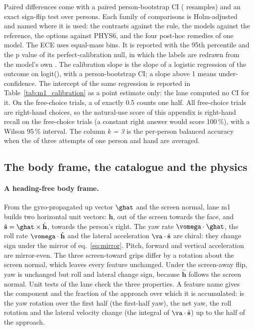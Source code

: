 Paired differences come with a paired person-bootstrap CI ( resamples) and an exact
sign-flip test over persons. Each family of comparisons is Holm-adjusted and named where it is used:
the  contrasts against the rule, the 
models against the reference, the  options against PHYS6, and
the four post-hoc remedies of one model. The ECE uses  equal-mass bins. It is reported
with the 95th percentile and the p value of its perfect-calibration null, in which the labels are
redrawn from the model's own \pright. The calibration slope is the slope of a logistic regression of
the outcome on logit(\pright), with a person-bootstrap CI; a slope above 1 means under-confidence. The
intercept of the same regression is reported in Table~\ref{tab:m1_calibration} as a point estimate
only: the lane computed no CI for it. On
the free-choice trials, a \pright{} of exactly 0.5 counts one half. All  free-choice
trials are right-hand choices, so the natural-use score of this appendix is right-hand recall on the
free-choice trials (a constant right answer would score 100\,\%), with a Wilson 95\,\% interval.
The column \emph{k = 3} is the per-person balanced accuracy when the \pright{} of three attempts of
one person and hand are averaged.

\subsection{The body frame, the catalogue and the physics}\label{app:m1:catalogue}

\paragraph{A heading-free body frame.} From the gyro-propagated up vector $\ghat$ and the screen
normal, lane m1 builds two horizontal unit vectors: $\hat{\mathbf h}$, out of the screen towards the
face, and $\hat{\mathbf s} = \ghat\times\hat{\mathbf h}$, towards the person's right. The yaw rate
$\vomega\cdot\ghat$, the roll rate $\vomega\cdot\hat{\mathbf h}$ and the lateral acceleration
$\va\cdot\hat{\mathbf s}$ are chiral: they change sign under the mirror of eq.~\eqref{eq:mirror}.
Pitch, forward and vertical acceleration are mirror-even. The three screen-toward grips differ by a
rotation about the screen normal, which leaves every feature unchanged. Under the screen-away flip,
yaw is unchanged but roll and lateral change sign, because $\hat{\mathbf h}$ follows the screen
normal. Unit tests of the lane check the three properties. A feature name gives the component and the
fraction of the approach over which it is accumulated:  is the yaw rotation over the
first half (the first-half yaw),  the net yaw,  the roll rotation and
 the lateral velocity change (the integral of $\va\cdot\hat{\mathbf s}$) up to the
half of the approach.


